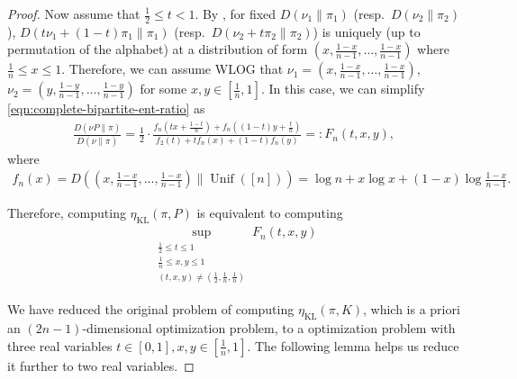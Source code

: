 \documentclass[11pt]{article}
\DeclareMathOperator\Unif{\mathrm{Unif}}
\DeclareMathOperator\KL{\mathrm{KL}}
\theoremstyle{definition}
\begin{document}
\begin{proof}
  Now assume that $\frac 12 \le t<1$. By \cite[Prop.~17]{gu2023non}, for fixed $D(\nu_1 \| \pi_1)$ (resp.~$D(\nu_2 \| \pi_2)$), $D(t \nu_1 + (1-t)\pi_1 \| \pi_1)$ (resp.~$D(\nu_2 + t \pi_2 \| \pi_2)$) is uniquely (up to permutation of the alphabet) at a distribution of form $\left(x, \frac{1-x}{n-1}, \ldots, \frac{1-x}{n-1}\right)$ where $\frac 1n \le x \le 1$.
  Therefore, we can assume WLOG that $\nu_1 = \left(x, \frac{1-x}{n-1}, \ldots, \frac{1-x}{n-1}\right)$, $\nu_2 = \left(y, \frac{1-y}{n-1}, \ldots, \frac{1-y}{n-1}\right)$ for some $x,y\in \left[\frac 1n, 1\right]$.
  In this case, we can simplify \cref{eqn:complete-bipartite-ent-ratio} as
  \begin{align}
    \frac{D(\nu P\| \pi)}{D(\nu \| \pi)} = \frac 12 \cdot \frac{f_n\left(t x+\frac{1-t}{n}\right) + f_n\left((1-t)y+\frac t n\right)}{f_2(t) + t f_n(x) + (1-t) f_n (y)} =: F_n(t,x,y),
  \end{align}
  where
  \begin{align}
    f_n(x) = D\left( \left(x, \frac{1-x}{n-1}, \ldots, \frac{1-x}{n-1}\right) \| \Unif([n]) \right)
    = \log n + x \log x + (1-x) \log \frac{1-x}{n-1}.
  \end{align}

  Therefore, computing $\eta_{\KL}(\pi, P)$ is equivalent to computing
  \begin{align} \label{eqn:complete-bipartite-three-var}
    \sup_{\substack{\frac 12 \le t\le 1\\ \frac 1n \le x,y\le 1\\ (t,x,y) \ne \left(\frac 12, \frac 1n, \frac 1n\right)}} F_n(t,x,y)
  \end{align}

  We have reduced the original problem of computing $\eta_{\KL}(\pi, K)$, which is a priori an $(2n-1)$-dimensional optimization problem, to a optimization problem with three real variables $t \in [0, 1], x,y \in \left[\frac 1n, 1\right]$. The following lemma helps us reduce it further to two real variables.


\end{proof}
\end{document}
